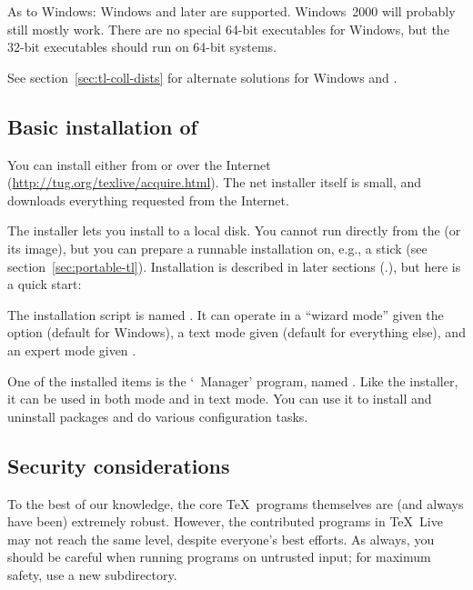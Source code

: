 \documentclass{article}
\begin{document}
As to Windows: Windows  and later are supported.  Windows~2000
will probably still mostly work.  There are no special 64-bit
executables for Windows, but the 32-bit executables should run on 64-bit
systems.

See section~\ref{sec:tl-coll-dists} for alternate solutions
for Windows and \MacOSX.

\subsection{Basic installation of \protect\TL{}}
\label{sec:basic}

You can install \TL{} either from \DVD{} or over the Internet
(\url{http://tug.org/texlive/acquire.html}). The net installer itself is
small, and downloads everything requested from the Internet.

The \DVD{} installer lets you install to a local disk.  You cannot run
\TL{} directly from the \TK{} \DVD{} (or its  image), but you
can prepare a runnable installation on, e.g., a \USB{} stick (see
section~\ref{sec:portable-tl}).  Installation is described in later
sections (\p.\pageref{sec:install}), but here is a quick start:

\begin{itemize*}

\item The installation script is named .  It can
  operate in a ``wizard mode'' given the option 
  (default for Windows), a text mode given  (default for
  everything else), and an expert \GUI{} mode given .

\item One of the installed items is the `\TL\ Manager' program,
  named .  Like the installer, it can be used in both \GUI{}
  mode and in text mode. You can use it to install and uninstall
  packages and do various configuration tasks.

\end{itemize*}


\subsection{Security considerations}
\label{sec:security}

To the best of our knowledge, the core \TeX\ programs themselves are
(and always have been) extremely robust.  However, the contributed
programs in \TeX\ Live may not reach the same level, despite everyone's
best efforts.  As always, you should be careful when running programs on
untrusted input; for maximum safety, use a new subdirectory.
\end{document}
